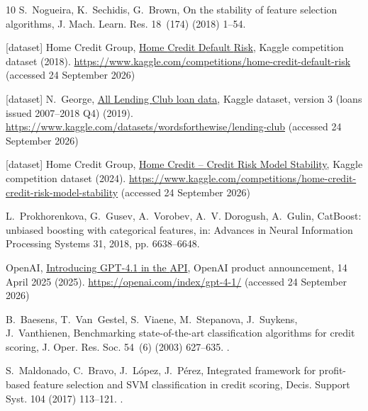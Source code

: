 \documentclass[final,5p,twocolumn]{elsarticle}
\begin{document}
\begin{thebibliography}{10}
S.~Nogueira, K.~Sechidis, G.~Brown, On the stability of feature selection
  algorithms, J. Mach. Learn. Res. 18~(174) (2018) 1--54.

[dataset] {Home Credit Group},
  \href{https://www.kaggle.com/competitions/home-credit-default-risk}{Home
  {C}redit {D}efault {R}isk}, Kaggle competition dataset (2018).
\newline\urlprefix\url{https://www.kaggle.com/competitions/home-credit-default-risk} (accessed 24 September 2026)

[dataset] N.~George,
  \href{https://www.kaggle.com/datasets/wordsforthewise/lending-club}{All
  {L}ending {C}lub loan data}, Kaggle dataset, version 3 (loans issued
  2007--2018 Q4) (2019).
\newline\urlprefix\url{https://www.kaggle.com/datasets/wordsforthewise/lending-club} (accessed 24 September 2026)

[dataset] {Home Credit Group},
  \href{https://www.kaggle.com/competitions/home-credit-credit-risk-model-stability}{Home
  {C}redit -- {C}redit {R}isk {M}odel {S}tability}, Kaggle competition dataset
  (2024).
\newline\urlprefix\url{https://www.kaggle.com/competitions/home-credit-credit-risk-model-stability} (accessed 24 September 2026)

L.~Prokhorenkova, G.~Gusev, A.~Vorobev, A.~V. Dorogush, A.~Gulin, {CatBoost}:
  unbiased boosting with categorical features, in: Advances in Neural
  Information Processing Systems 31, 2018, pp. 6638--6648.

{OpenAI}, \href{https://openai.com/index/gpt-4-1/}{Introducing {GPT-4.1} in the
  {API}}, OpenAI product announcement, 14 April 2025 (2025).
\newline\urlprefix\url{https://openai.com/index/gpt-4-1/} (accessed 24 September 2026)

B.~Baesens, T.~Van~Gestel, S.~Viaene, M.~Stepanova, J.~Suykens, J.~Vanthienen,
  Benchmarking state-of-the-art classification algorithms for credit scoring,
  J. Oper. Res. Soc. 54~(6) (2003) 627--635.
\newblock \href {https://doi.org/10.1057/palgrave.jors.2601545}
  {}.

S.~Maldonado, C.~Bravo, J.~L{\'o}pez, J.~P{\'e}rez, Integrated framework for
  profit-based feature selection and {SVM} classification in credit scoring,
  Decis. Support Syst. 104 (2017) 113--121.
\newblock \href {https://doi.org/10.1016/j.dss.2017.10.007}
  {}.


\end{thebibliography}
\end{document}
